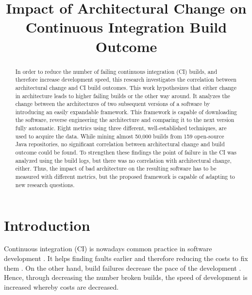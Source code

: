 \documentclass[conference]{IEEEtran}
\begin{document}
\title{Impact of Architectural Change on
	Continuous Integration Build Outcome\\
}

\author{

\and
{}
}

\maketitle

\begin{abstract}
In order to reduce the number of failing continuous integration (CI) builds, and therefore increase development speed, this research investigates the correlation between architectural change and CI build outcomes. This work hypothesizes that either change in architecture leads to higher failing builds or the other way around.  
It analyzes the change between the architectures of two subsequent versions of a software by introducing an easily expandable framework.
This framework is capable of downloading the software, reverse engineering the architecture and comparing it to the next version fully automatic. 
Eight metrics using three different, well-established techniques, are used to acquire the data. While mining almost 50,000 builds from 159 open-source Java repositories, no significant correlation between architectural change and build outcome could be found. 
To strengthen these findings the point of failure in the CI was analyzed using the build logs, but there was no correlation with architectural change, either. 
Thus, the impact of bad architecture on the resulting software has to be measured with different metrics, but the proposed framework is capable of adapting to new research questions.
\end{abstract}

\section{Introduction}

Continuous integration (CI) is nowadays common practice in software development \cite{CI-Common}. It helps finding faults earlier and therefore reducing the costs to fix them \cite{NutzenCI}. On the other hand, build failures decrease the pace of the development \cite{Costs-BuildFailures}. Hence, through decreasing the number broken builds, the speed of development is increased whereby costs are decreased.
\end{document}
